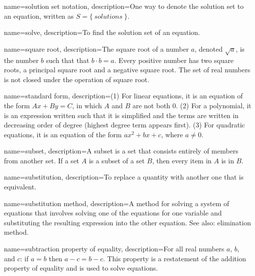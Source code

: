  {
	name=solution set notation,
	description={One way to denote the solution set to an equation, written as $S = \{ ~solutions~\}$.}
}


 {
	name=solve,
	description={To find the solution set of an equation.}
}

 {
	name=square root,
	description={The square root of a number $a$, denoted $\sqrt{a}$, is the number $b$ such that that $b \cdot b = a$. Every positive number has two square roots, a \gls{principal square root} and a negative square root. The set of real numbers is not closed under the operation of square root.}
}

 {
	name=standard form,
	description={(1) For linear equations, it is an equation of the form $Ax + By = C$, in which $A$ and $B$ are not both 0. (2) For a polynomial, it is an expression written such that it is simplified and the terms are written in decreasing order of degree (highest degree term appears first). (3) For quadratic equations, it is an equation of the form $ax^2 + bx + c$, where $a \neq 0$.}
}

 {
	name=subset,
	description={A subset is a set that consists entirely of members from another set. If a set $A$ is a subset of a set $B$, then every item in $A$ is in $B$.}
}

 {
	name=substitution,
	description={To replace a quantity with another one that is equivalent.}
}

 {
	name=substitution method,
	description={A method for solving a system of equations that involves solving one of the equations for one variable and substituting the resulting expression into the other equation. See also: \gls{elimination method}.}
}

 {
	name=subtraction property of equality,
	description={For all real numbers $a$, $b$, and $c$: if $a = b$ then $a - c = b - c$. This property is a restatement of the \gls{addition property of equality} and is used to solve equations.}
}

